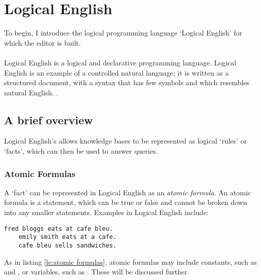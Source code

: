 \documentclass[../main.tex]{subfiles}
\begin{document}
\chapter{Logical English}
\label{chapter:le}
To begin, I introduce the logical programming language `Logical English' for which the editor is built.
\\
\\
Logical English is a logical and declarative programming language. Logical English is an example of a controlled natural language; it is written as a structured document, with a syntax that has few symbols and which resembles natural English. \cite{logical_english}.

\section{A brief overview}
Logical English's allows knowledge bases to be represented as logical `rules' or `facts', which can then be used to answer queries. 

\subsection{Atomic Formulas}
A `fact' can be represented in Logical English as an \textit{atomic formula}. An atomic formula is a statement, which can be true or false and cannot be broken down into any smaller statements. Examples in Logical English include:
\begin{lstlisting}[language={LE},caption={An example of three atomic formulas in Logical English.},label={le:atomic formulas}]
    fred bloggs eats at cafe bleu.
    emily smith eats at a cafe.
    cafe bleu sells sandwiches.
\end{lstlisting}
As in listing \ref{le:atomic formulas}, atomic formulas may include constants, such as  and , or variables, such as . These will be discussed further.
\end{document}
